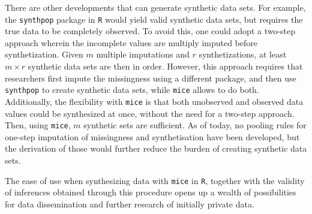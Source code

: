 \documentclass[psych,article,submit,moreauthors,pdftex]{mdpi}
\begin{document}
There are other developments that can generate synthetic data sets. For
example, the \texttt{synthpop} \citep{synthpop} package in \texttt{R}
would yield valid synthetic data sets, but requires the true data to be
completely observed. To avoid this, one could adopt a two-step approach
wherein the incomplete values are multiply imputed before
synthetization. Given \(m\) multiple imputations and \(r\)
synthetizations, at least \(m \times r\) synthetic data sets are then in
order. However, this approach requires that researchers first impute the
missingness using a different package, and then use \texttt{synthpop} to
create synthetic data sets, while \texttt{mice} allows to do both.
Additionally, the flexibility with \texttt{mice} is that both unobserved
and observed data values could be synthesized at once, without the need
for a two-step approach. Then, using \texttt{mice}, \(m\) synthetic sets
are sufficient. As of today, no pooling rules for one-step imputation of
missingness and synthetisation have been developed, but the derivation
of those would further reduce the burden of creating synthetic data
sets.

The ease of use when synthesizing data with \texttt{mice} in \texttt{R},
together with the validity of inferences obtained through this procedure
opens up a wealth of possibilities for data dissemination and further
research of initially private data.

%

\vspace{6pt}






\end{document}
